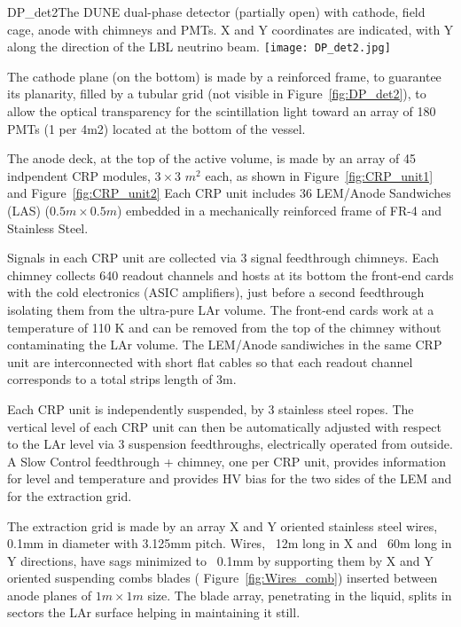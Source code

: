 \begin{cdrfigure}{DP_det2}{The DUNE dual-phase detector (partially open) with cathode, field cage, anode with chimneys and PMTs. X and Y coordinates are indicated, with Y along the direction of the LBL neutrino beam.}
\texttt{[image: DP\_det2.jpg]}
\end{cdrfigure}

The cathode plane (on the bottom) is made by a reinforced frame, to guarantee its planarity, filled by a tubular grid (not visible in Figure~\ref{fig:DP_det2}), to allow the optical transparency for the scintillation light toward an array of 180 PMTs (1 per 4m2) located at the bottom of the vessel.

The anode deck, at the top of the active volume, is made by an array of 45 indpendent CRP modules, $3\times3$ $m^2$ each, as shown in Figure~\ref{fig:CRP_unit1} and Figure~\ref{fig:CRP_unit2} Each CRP unit includes 36 LEM/Anode Sandwiches (LAS) ($0.5m\times 0.5m$) embedded in  a mechanically reinforced frame of FR-4 and Stainless Steel. 

Signals in each CRP unit are collected via 3 signal feedthrough chimneys. Each chimney collects 640 readout channels and hosts at its bottom the front-end cards with the cold electronics (ASIC amplifiers), just before a second feedthrough isolating them from the ultra-pure LAr volume. The front-end cards work at a temperature of 110 K and can be removed from the top of the chimney without contaminating the LAr volume. The LEM/Anode sandiwiches in the same CRP unit are interconnected with short flat cables so that each readout channel corresponds to a total strips length of 3m.
  
Each CRP unit is independently suspended,  by 3 stainless steel ropes. The  vertical level of each CRP unit can then be automatically adjusted with respect to the LAr level via 3 suspension feedthroughs, electrically operated from outside. A Slow Control feedthrough + chimney, one per CRP unit, provides  information for level and temperature and provides HV bias for the two sides of the LEM  and for the extraction grid.

The extraction grid is made by an array X and Y oriented stainless steel wires, 0.1mm in diameter with 3.125mm pitch. 
Wires, ~12m long in X and ~60m long in Y directions, have sags minimized to ~0.1mm by supporting them by X and Y oriented suspending combs blades ( Figure~\ref{fig:Wires_comb}) inserted between anode planes of $1m \times 1m$ size. The blade array, penetrating in the liquid, splits in sectors the LAr surface helping in maintaining it still.

